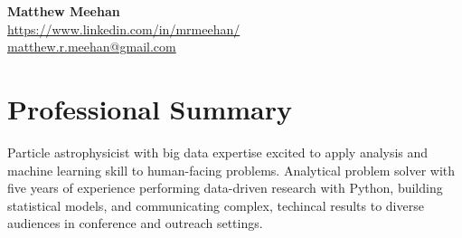\documentclass[letterpaper,11pt]{article}
\begin{document}

\begin{center}

    \textbf{\Large Matthew Meehan}\\
    \href{https://www.linkedin.com/in/mrmeehan/}{\faLinkedinSquare}
    \href{https://www.linkedin.com/in/mrmeehan/}{ https://www.linkedin.com/in/mrmeehan/}\\
    \href{mailto:matthew.r.meehan@gmail.com}{\faEnvelopeO}
    \href{mailto:matthew.r.meehan@gmail.com}{matthew.r.meehan@gmail.com}\\

\end{center}

%


\section{Professional Summary}
{\small Particle astrophysicist with big data expertise excited to apply analysis and machine learning skill to human-facing problems. Analytical problem solver with 
five years of experience performing data-driven research with Python, building statistical models, and communicating complex, techincal results to diverse 
audiences in conference and outreach settings.}
\end{document}
